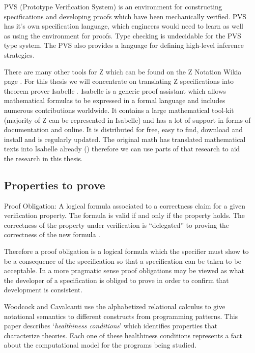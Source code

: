 PVS (Prototype Verification System) \cite{pvs} is an environment for
constructing specifications and developing proofs which have been mechanically
verified. PVS has it's own specification language, which engineers would need to
learn as well as using the environment for proofs. Type checking is undecidable
for the PVS type system. The PVS also provides a language for defining
high-level inference strategies.

There are many other tools for Z which can be found on the Z Notation Wikia page
\cite{zwikia}. For this thesis we will concentrate on translating Z
specifications into theorem prover Isabelle \cite{isabelle}. Isabelle is a
generic proof assistant which allows mathematical formulas to be expressed in a
formal language and includes numerous contributions worldwide. It contains a
large mathematical tool-kit (majority of Z can be represented in Isabelle) and
has a lot of support in forms of documentation and online. It is distributed for
free, easy to find, download and install and is regularly updated. The original
\gls{math} has translated mathematical texts into Isabelle already
(\cite{mathintoisa}) therefore we can use parts of that research to aid the
research in this thesis.

\subsection{Properties to prove}
\label{subsec:propertiestoprove}

\begin{defin}
Proof Obligation: A logical formula associated to a correctness claim for a given verification
property. The formula is valid if and only if the property holds. The
correctness of the property under verification is “delegated” to proving the
correctness of the new formula \cite{handbookofembed}.
\end{defin}

Therefore a proof obligation is a logical formula which the specifier must show
to be a consequence of the specification so that a specification can be taken to
be acceptable. In a more pragmatic sense proof obligations may be viewed as what
the developer of a specification is obliged to prove in order to confirm that
development is consistent.

Woodcock and Cavalcanti \cite{woodcock2004tutorial} use the alphabetized
relational calculus to give notational semantics to different constructs from
programming patterns. This paper describes `\emph{healthiness conditions}' which
identifies properties that characterize theories. Each one of these healthiness
conditions represents a fact about the computational model for the programs
being studied.


